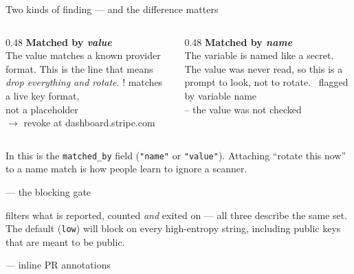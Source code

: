 \begin{frame}{Two kinds of finding — and the difference matters}
  \begin{columns}[T]
    \begin{column}{0.48\textwidth}
      \textbf{Matched by \emph{value}}\\[0.3em]
      {\footnotesize The value matches a known provider format. This is the
      line that means \emph{drop everything and rotate}.}
      \vspace{0.4em}
      {\scriptsize\ttfamily
      ! matches a live key format,\\ \phantom{! }not a placeholder\\
      $\rightarrow$ revoke at dashboard.stripe.com}
    \end{column}
    \begin{column}{0.48\textwidth}
      \textbf{Matched by \emph{name}}\\[0.3em]
      {\footnotesize The variable is named like a secret. The value was never
      read, so this is a prompt to look, not to rotate.}
      \vspace{0.4em}
      {\scriptsize\ttfamily
      \textperiodcentered\ flagged by variable name\\ \phantom{. }-- the value was not checked}
    \end{column}
  \end{columns}

  \vspace{1em}
  {\footnotesize In  this is the \texttt{matched\_by} field
  (\texttt{"name"} or \texttt{"value"}). Attaching ``rotate this now'' to a name
  match is how people learn to ignore a scanner.}
\end{frame}

\begin{frame}[fragile]{ — the blocking gate}

  {\footnotesize {} filters what is reported, counted
  \emph{and} exited on — all three describe the same set. The default
  (\texttt{low}) will block on every high-entropy string, including public keys
  that are meant to be public.}
\end{frame}

\begin{frame}[fragile]{ — inline PR annotations}
\end{frame}

